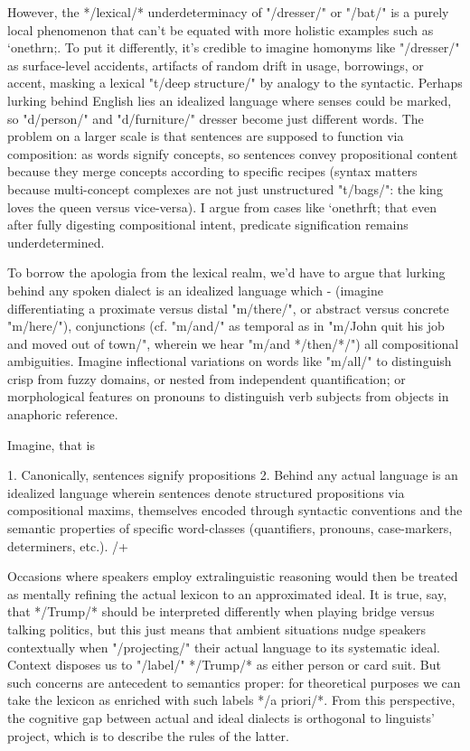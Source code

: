 However, the */lexical/* underdeterminacy of "/dresser/" or "/bat/"  
is a purely local phenomenon that can't be equated with more holistic 
examples such as `onethrn;.  To put it differently, 
it's credible to imagine homonyms like "/dresser/"  
as surface-level accidents, artifacts of random drift in usage, borrowings, or 
accent, masking a lexical 
"t/deep structure/" by analogy to the syntactic.  
Perhaps lurking behind English lies an idealized language where senses 
could be marked, so "d/person/" and "d/furniture/" dresser become just 
different words.  The problem on a larger scale is that sentences are supposed to 
function via composition: as words signify concepts, so sentences 
convey propositional content because they merge concepts according 
to specific recipes (syntax matters because multi-concept complexes 
are not just unstructured "t/bags/": the king loves the queen versus vice-versa).  
I argue from cases like `onethrft; that even after fully digesting 
compositional intent, predicate signification remains underdetermined.

To borrow the apologia from the lexical realm, we'd have to argue that 
lurking behind any spoken dialect is an idealized language 
which  -%
(imagine differentiating a proximate versus distal "m/there/", or abstract versus concrete 
"m/here/"), 
conjunctions (cf. "m/and/" as temporal as in "m/John quit his job and moved out of town/", 
wherein we hear "m/and */then/*/") %
all compositional ambiguities.  Imagine inflectional variations 
on words like "m/all/" to distinguish crisp from fuzzy domains, or nested from 
independent quantification; or morphological features on pronouns to 
distinguish verb subjects from objects in anaphoric reference.  

Imagine, that is %

 1.  Canonically, sentences signify propositions %
 2.  Behind any actual language is an idealized language wherein sentences denote 
structured propositions via compositional maxims, themselves encoded through 
syntactic conventions and the semantic properties of specific word-classes 
(quantifiers, pronouns, case-markers, determiners, etc.).
/+

Occasions where speakers employ extralinguistic reasoning 
would then be treated as mentally refining the 
actual lexicon to an approximated ideal.   
It is true, say, that */Trump/* should be interpreted differently 
when playing bridge versus talking politics, but this just means that 
ambient situations nudge speakers contextually when "/projecting/"  
their actual language to its systematic ideal.  Context 
disposes us to "/label/" */Trump/* as either person or card 
suit.  But such concerns are antecedent to semantics proper: for theoretical 
purposes we can take the lexicon as enriched with such labels */a priori/*.
From this perspective, the cognitive gap between 
actual and ideal dialects is orthogonal to linguists' 
project, which is to describe the rules of the latter.    


